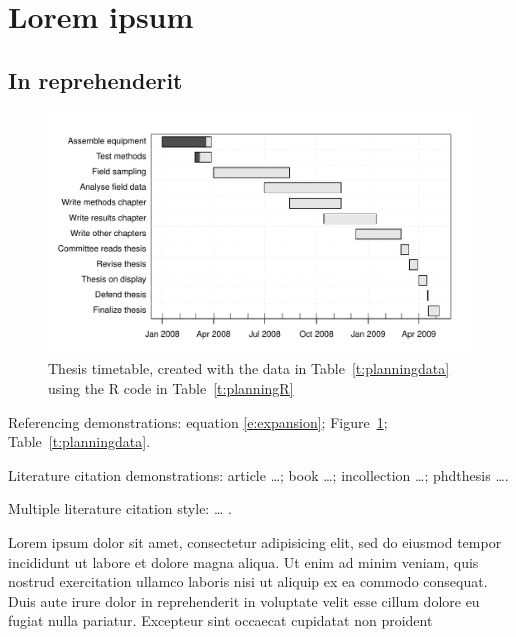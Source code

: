 \documentclass[logo=logo-eagle]{thesis_proposal}
\begin{document}
\mainmatter                     %

%

\section{Lorem ipsum}

\subsection{In reprehenderit}

\begin{figure}[t]
  \begin{center}
    \includegraphics[width=\hsize]{planning} %
  \end{center}
  \caption[Research timetable.]{\label{f:planning}Thesis timetable, created
  with the data in Table~\ref{t:planningdata} using the R code in Table~\ref{t:planningR}}
\end{figure}

Referencing demonstrations:
equation \eqref{e:expansion};
Figure~\ref{f:planning};
Table~\ref{t:planningdata}.

Literature citation demonstrations:
article \cite{Voss:2001} \dots \cite[]{Voss:2001};
book \cite{JeffreysJeffreys1972}  \dots \cite[]{JeffreysJeffreys1972};
incollection \cite{Marshall1985}  \dots\cite[]{Marshall1985};
phdthesis \cite{Michel:1974} \dots \cite[]{Michel:1974}.

Multiple literature citation style:
\cite{Voss:2001,Jahnke:1990} \dots
\cite[]{Voss:2001,Jahnke:1990}.

Lorem ipsum dolor sit amet, consectetur adipisicing elit, sed do
eiusmod tempor incididunt ut labore et dolore magna aliqua. Ut enim ad
minim veniam, quis nostrud exercitation ullamco laboris nisi ut
aliquip ex ea commodo consequat. Duis aute irure dolor in
reprehenderit in voluptate velit esse cillum dolore eu fugiat nulla
pariatur. Excepteur sint occaecat cupidatat non proident
\end{document}
